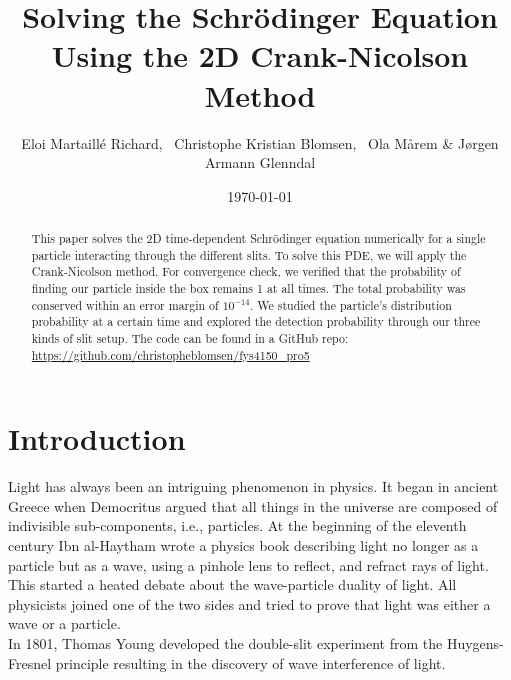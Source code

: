 \documentclass[english,notitlepage,reprint,nofootinbib]{revtex4-2}  %
\begin{document}
	
	\title{\Huge{Solving the Schrödinger Equation Using the 2D Crank-Nicolson Method}}  %
	\author{Eloi Martaillé Richard,
	\
	Christophe Kristian Blomsen,
	\
	Ola Mårem
	\&
	Jørgen Armann Glenndal
    }
	\date{\today}                             %
	\noaffiliation                            %
	
	\begin{abstract}
This paper solves the 2D time-dependent Schrödinger equation numerically for a single particle
	interacting through the different slits. To solve this PDE, we will apply the
	Crank-Nicolson method. For convergence check, we verified that the probability of finding our particle inside the box remains 1 at all times. The total probability was conserved within an
	error margin of  $10^{-14}$. We studied the particle's distribution probability at a certain time and explored the detection probability through our three kinds of slit setup.
	The code can be found in a GitHub repo:		\href{https://github.com/christopheblomsen/fys4150_pro5}{https://github.com/christopheblomsen/fys4150\_pro5}

\end{abstract}
	\maketitle	
	
	
	\section{Introduction} \label{sec:introduction}

	Light has always been an intriguing phenomenon in physics. It began in ancient Greece when Democritus argued that all things in the universe are composed of indivisible
	sub-components, i.e., particles. At the beginning of the eleventh century Ibn al-Haytham
	wrote a physics book describing light no longer as a particle but as a wave, using a
	pinhole lens to reflect, and refract rays of light. This started a heated debate about the
	wave-particle duality of light. All physicists joined one of the two sides and tried to
	prove that light was either a wave or a particle. \\

	In 1801, Thomas Young developed the double-slit experiment from the Huygens-Fresnel principle
	resulting in the discovery of wave interference of light\cite{ThomasYoung}.
\end{document}
